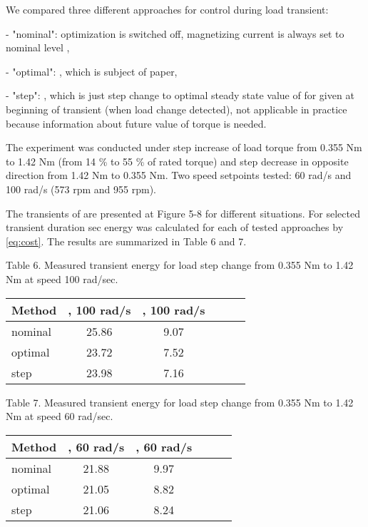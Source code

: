 \documentclass[journal]{IEEEtran}
\begin{document}
We compared three different approaches for control  during load transient:

- "nominal": optimization is switched off, magnetizing current  is always set to nominal level ,

- "optimal": , which is subject of paper,

- "step": , which is just step change to optimal steady state value of  for given  at beginning of transient (when load change detected), not applicable in practice because information about future value of torque  is needed.

The experiment was conducted under step increase of load torque from 0.355 Nm to 1.42 Nm (from 14 \% to 55 \% of rated torque) and step decrease in opposite direction from 1.42 Nm to 0.355 Nm. Two speed setpoints tested: 60 rad/s and 100 rad/s (573 rpm and 955 rpm).

The transients of  are presented at Figure 5-8 for different situations. For selected transient duration  sec energy  was calculated for each of tested approaches by \eqref{eq:cost}. The results are summarized in Table 6 and 7.


\begin{center}
Table 6.
Measured transient energy for load step change from 0.355 Nm to 1.42 Nm at speed 100 rad/sec.

\begin{tabular}{ | l | c | c | c | c | c | }
\hline 
Method & , 100 rad/s & , 100 rad/s \\
\hline 
nominal & 25.86  & 9.07   \\
optimal & 23.72  & 7.52   \\
step & 23.98  & 7.16   \\
\hline 
\end{tabular}

\end{center}

\begin{center}
Table 7.
Measured transient energy for load step change from 0.355 Nm to 1.42 Nm at speed 60 rad/sec.

\begin{tabular}{ | l | c | c | c | c | c | }
\hline 
Method & , 60 rad/s & , 60 rad/s \\
\hline 
nominal & 21.88  & 9.97   \\
optimal & 21.05  & 8.82   \\
step & 21.06  & 8.24   \\
\hline 
\end{tabular}

\end{center}
\end{document}
